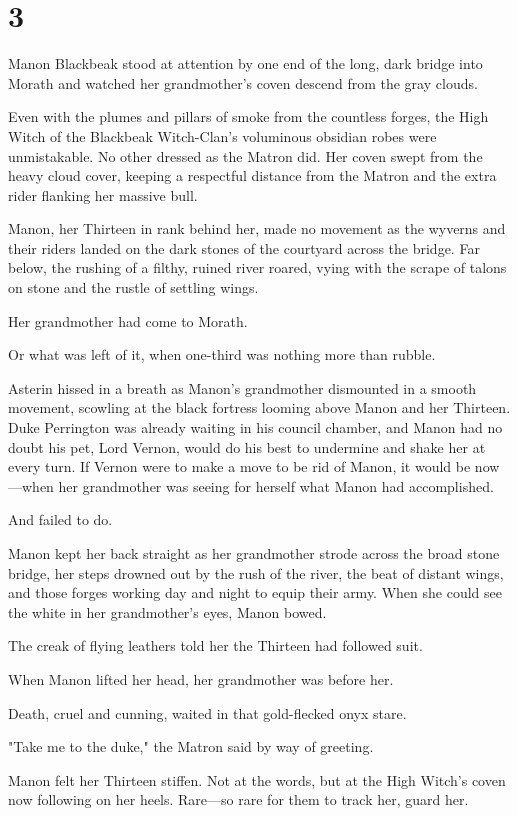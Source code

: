 
\chapter{3}

Manon Blackbeak stood at attention by one end of the long, dark bridge into Morath and watched her grandmother's coven descend from the gray clouds.

Even with the plumes and pillars of smoke from the countless forges, the High Witch of the Blackbeak Witch-Clan's voluminous obsidian robes were unmistakable.
No other dressed as the Matron did.
Her coven swept from the heavy cloud cover, keeping a respectful distance from the Matron and the extra rider flanking her massive bull.

Manon, her Thirteen in rank behind her, made no movement as the wyverns and their riders landed on the dark stones of the courtyard across the bridge.
Far below, the rushing of a filthy, ruined river roared, vying with the scrape of talons on stone and the rustle of settling wings.

Her grandmother had come to Morath.

Or what was left of it, when one-third was nothing more than rubble.

Asterin hissed in a breath as Manon's grandmother dismounted in a smooth movement, scowling at the black fortress looming above Manon and her Thirteen.
Duke Perrington was already waiting in his council chamber, and Manon had no doubt his pet, Lord Vernon, would do his best to undermine and shake her at every turn.
If Vernon were to make a move to be rid of Manon, it would be now---when her grandmother was seeing for herself what Manon had accomplished.

And failed to do.

Manon kept her back straight as her grandmother strode across the broad stone bridge, her steps drowned out by the rush of the river, the beat of distant wings, and those forges working day and night to equip their army.
When she could see the white in her grandmother's eyes, Manon bowed.

The creak of flying leathers told her the Thirteen had followed suit.

When Manon lifted her head, her grandmother was before her.

Death, cruel and cunning, waited in that gold-flecked onyx stare.

"Take me to the duke," the Matron said by way of greeting.

Manon felt her Thirteen stiffen.
Not at the words, but at the High Witch's coven now following on her heels.
Rare---so rare for them to track her, guard her.

